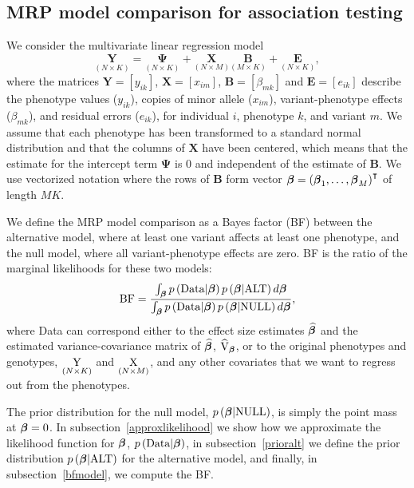 \subsection*{MRP model comparison for association testing}
We consider the multivariate linear regression model 
$$\underset{\left(N\times K\right)}{\mathbf{\textrm{Y}}} 
= \underset{\left(N\times K\right)}{\mathbf{\Psi}}  + \underset{\left(N\times M\right)}{\mathbf{\textrm{X}}}\underset{\left(M \times K\right)}{\mathbf{\textrm{B}}} 
+ \underset{\left(N\times K\right)}{\mathbf{\textrm{E}}},$$
where the matrices $\mathbf{\textrm{Y}} = \left[{y}_{i k}\right]$, $\mathbf{\textrm{X}} = \left[ x_{i m}\right]$, 
$\mathbf{\textrm{B}} = \left[ \beta_{m k} \right]$ and $\mathbf{\textrm{E}} = \left[e_{i k}\right]$  describe the phenotype values ($y_{i k}$),
copies of minor allele ($x_{i m}$), variant-phenotype effects ($\beta_{m k}$), and residual errors ($e_{i k}$), 
for individual $i$, phenotype $k$, and variant $m$. 
We assume that each phenotype has been transformed to a standard normal
distribution and that the columns of ${\mathbf{{\textrm{X}}}}$ 
have been centered, which means that the estimate for the intercept term ${\mathbf{\Psi}}$ is 0 and independent of the estimate of ${\mathbf{\textrm{B}}}$.
We use vectorized notation where the rows of ${\mathbf{\textrm{B}}}$ form vector 
$\boldsymbol {{ \beta}} = \left(\boldsymbol {{ \beta}}_{1},\dots,\boldsymbol {{\beta}}_{M}\right)^{\intercal}$
of length $MK$.

We define the MRP model comparison as a Bayes factor (BF) between the alternative model, where at least one variant
affects at least one phenotype, and the null model, where all variant-phenotype effects are zero.  
BF is the ratio of the marginal likelihoods for these two models: 
$$ \textrm{BF} = \frac{\int_{{\boldsymbol {\beta}}}p\left(\mathbf{\textrm{Data}}|{\boldsymbol {\beta}}\right)p\left({\boldsymbol {\beta}}|\textrm{ALT}\right)d{\boldsymbol {\beta}}}{\int_{{\boldsymbol {\beta}}}p\left(\mathbf{\textrm{Data}}|{\boldsymbol {\beta}}\right)p\left({\boldsymbol {\beta}}|\textrm{NULL}\right)d{\boldsymbol {\beta}}},$$ 
where Data can correspond either to the effect size estimates $\boldsymbol {\widehat{ \beta}}$ and the estimated variance-covariance matrix of  $\boldsymbol {\widehat{ \beta}}$, $\widehat{\mathbf{\textrm{V}}}_{\boldsymbol{\beta}}$, or to the original phenotypes and genotypes, 
$\underset{\left(N\times K\right)}{\mathbf{\textrm{\textrm{Y}}}}$ and $ \underset{\left(N\times M\right)}{\mathbf{\textrm{\textrm{X}}}}$, and any other covariates that we
want to regress out from the phenotypes. 

The prior distribution for the null model, $p\left({\boldsymbol {\beta}}|\textrm{NULL}\right)$, is simply the point mass at $\boldsymbol \beta = 0$.
In subsection~\ref{approxlikelihood} we show how we approximate the likelihood function for $\boldsymbol \beta$, $p\left(\mathbf{\textrm{Data}} | {\boldsymbol {\beta}}\right)$,
in subsection~\ref{prioralt} we define the prior distribution $p\left({\boldsymbol {\beta}}|\textrm{ALT}\right)$ for the alternative model, 
and finally, in subsection~\ref{bfmodel}, we compute the BF.

